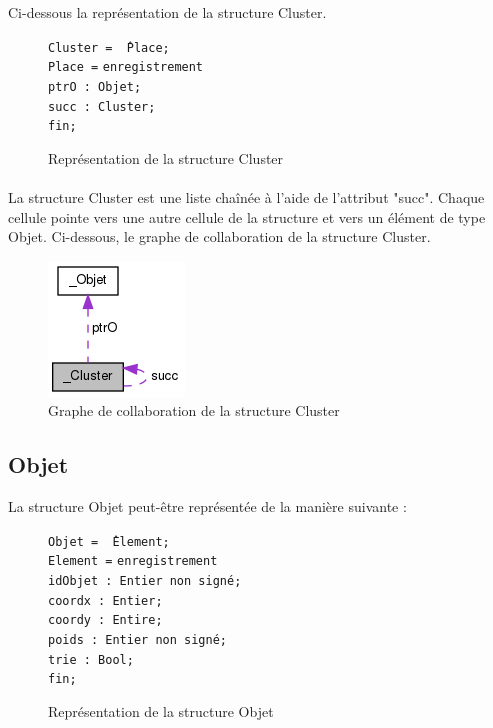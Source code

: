 \documentclass[twoside,UTF8]{EPURapport}
\begin{document}
Ci-dessous la représentation de la structure Cluster. 
\begin{figure}[H]

\begin{tabbing}
\texttt{Cluster = \^\,Place;} \\
\texttt{Place =} \= \texttt{enregistrement} \\
\> \texttt{ptrO : Objet;} \\
\> \texttt{succ : Cluster;} \\
\> \texttt{fin;}\\
\end{tabbing}

\caption{Représentation de la structure Cluster}
\end{figure}

\paragraph{}
La structure Cluster est une liste cha\^inée à l'aide de l'attribut "succ". Chaque cellule pointe vers une autre cellule de la structure et vers un élément de type Objet.
Ci-dessous, le graphe de collaboration de la structure Cluster.  

\begin{figure}[H]
\center
\includegraphics[scale=0.5]{images/struct_cluster.png}
\caption{Graphe de collaboration de la structure Cluster}
\end{figure} 

\subsection{Objet}
\label{subsec:Objet.h}
La structure Objet peut-\^etre représentée de la manière suivante : 
\begin{figure}[H]
\begin{tabbing}
\texttt{Objet = \^\,Element;}\\
\texttt{Element =} \= \texttt{enregistrement}\\
\> \texttt{idObjet : Entier non signé;} \\
\> \texttt{coordx : Entier;} \\
\> \texttt{coordy : Entire;} \\
\> \texttt{poids : Entier non signé;} \\
\> \texttt{trie : Bool;} \\
\> \texttt{fin;}\\
\end{tabbing}

\caption{Représentation de la structure Objet}
\end{figure}
\end{document}
